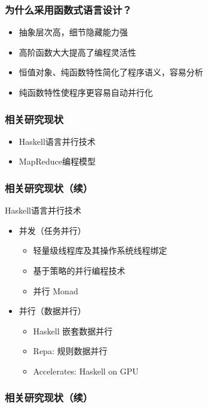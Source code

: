 \documentclass[]{beamer}
\begin{document}
\begin{frame}
  \frametitle{为什么采用函数式语言设计？}
  \begin{itemize}
    \item 抽象层次高，细节隐藏能力强
    \item 高阶函数大大提高了编程灵活性
    \item 恒值对象、纯函数特性简化了程序语义，容易分析
    \item 纯函数特性使程序更容易自动并行化
  \end{itemize}
\end{frame}

\begin{frame}
  \frametitle{相关研究现状}
  \begin{itemize}
    \item Haskell语言并行技术
    \item MapReduce编程模型
  \end{itemize}
\end{frame}

\begin{frame}
  \frametitle{相关研究现状（续）}
  Haskell语言并行技术
  \begin{itemize}
    \item 并发（任务并行）
      \begin{itemize}
        \item 轻量级线程库及其操作系统线程绑定
        \item 基于策略的并行编程技术
        \item 并行 Monad
      \end{itemize}
    \item 并行（数据并行）
      \begin{itemize}
        \item Haskell 嵌套数据并行
        \item Repa: 规则数据并行
        \item Accelerates: Haskell on GPU
      \end{itemize}
  \end{itemize}
\end{frame}

\begin{frame}
  \frametitle{相关研究现状（续）}
\end{frame}
\end{document}
